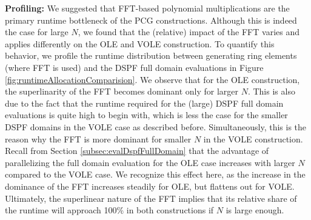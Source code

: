 \textbf{Profiling:} We suggested that FFT-based polynomial multiplications are the primary runtime bottleneck of the PCG constructions. Although this is indeed the case for large $N$, we found that the (relative) impact of the FFT varies and applies differently on the OLE and VOLE construction. To quantify this behavior, we profile the runtime distribution between generating ring elements (where FFT is used) and the DSPF full domain evaluations in Figure \ref{fig:runtimeAllocationComparision}. We observe that for the OLE construction, the superlinarity of the FFT becomes dominant only for larger $N$. This is also due to the fact that the runtime required for the (large) DSPF full domain evaluations is quite high to begin with, which is less the case for the smaller DSPF domains in the VOLE case as described before. Simultaneously, this is the reason why the FFT is more dominant for smaller $N$ in the VOLE construction. Recall from Section \ref{subsec:evalDspfFullDomain} that the advantage of parallelizing the full domain evaluation for the OLE case increases with larger $N$ compared to the VOLE case. We recognize this effect here, as the increase in the dominance of the FFT increases steadily for OLE, but flattens out for VOLE. Ultimately, the superlinear nature of the FFT implies that its relative share of the runtime will approach 100\% in both constructions if $N$ is large enough.


